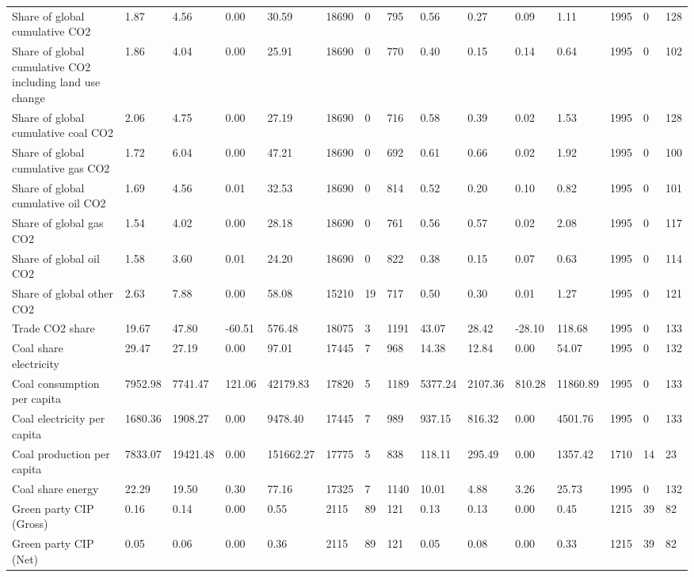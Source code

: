 \begin{longtable}{lllllllllllllll}
Share of global cumulative CO2 & 1.87 & 4.56 & 0.00 & 30.59 & 18690 & 0 & 795 & 0.56 & 0.27 & 0.09 & 1.11 & 1995 & 0 & 128\\
Share of global cumulative CO2 including land use change & 1.86 & 4.04 & 0.00 & 25.91 & 18690 & 0 & 770 & 0.40 & 0.15 & 0.14 & 0.64 & 1995 & 0 & 102\\
Share of global cumulative coal CO2 & 2.06 & 4.75 & 0.00 & 27.19 & 18690 & 0 & 716 & 0.58 & 0.39 & 0.02 & 1.53 & 1995 & 0 & 128\\
Share of global cumulative gas CO2 & 1.72 & 6.04 & 0.00 & 47.21 & 18690 & 0 & 692 & 0.61 & 0.66 & 0.02 & 1.92 & 1995 & 0 & 100\\
\addlinespace
Share of global cumulative oil CO2 & 1.69 & 4.56 & 0.01 & 32.53 & 18690 & 0 & 814 & 0.52 & 0.20 & 0.10 & 0.82 & 1995 & 0 & 101\\
Share of global gas CO2 & 1.54 & 4.02 & 0.00 & 28.18 & 18690 & 0 & 761 & 0.56 & 0.57 & 0.02 & 2.08 & 1995 & 0 & 117\\
Share of global oil CO2 & 1.58 & 3.60 & 0.01 & 24.20 & 18690 & 0 & 822 & 0.38 & 0.15 & 0.07 & 0.63 & 1995 & 0 & 114\\
Share of global other CO2 & 2.63 & 7.88 & 0.00 & 58.08 & 15210 & 19 & 717 & 0.50 & 0.30 & 0.01 & 1.27 & 1995 & 0 & 121\\
Trade CO2 share & 19.67 & 47.80 & -60.51 & 576.48 & 18075 & 3 & 1191 & 43.07 & 28.42 & -28.10 & 118.68 & 1995 & 0 & 133\\
\addlinespace
Coal share electricity & 29.47 & 27.19 & 0.00 & 97.01 & 17445 & 7 & 968 & 14.38 & 12.84 & 0.00 & 54.07 & 1995 & 0 & 132\\
Coal consumption per capita & 7952.98 & 7741.47 & 121.06 & 42179.83 & 17820 & 5 & 1189 & 5377.24 & 2107.36 & 810.28 & 11860.89 & 1995 & 0 & 133\\
Coal electricity per capita & 1680.36 & 1908.27 & 0.00 & 9478.40 & 17445 & 7 & 989 & 937.15 & 816.32 & 0.00 & 4501.76 & 1995 & 0 & 133\\
Coal production per capita & 7833.07 & 19421.48 & 0.00 & 151662.27 & 17775 & 5 & 838 & 118.11 & 295.49 & 0.00 & 1357.42 & 1710 & 14 & 23\\
Coal share energy & 22.29 & 19.50 & 0.30 & 77.16 & 17325 & 7 & 1140 & 10.01 & 4.88 & 3.26 & 25.73 & 1995 & 0 & 132\\
\addlinespace
Green party CIP (Gross) & 0.16 & 0.14 & 0.00 & 0.55 & 2115 & 89 & 121 & 0.13 & 0.13 & 0.00 & 0.45 & 1215 & 39 & 82\\
Green party CIP (Net) & 0.05 & 0.06 & 0.00 & 0.36 & 2115 & 89 & 121 & 0.05 & 0.08 & 0.00 & 0.33 & 1215 & 39 & 82\\

\end{longtable}

